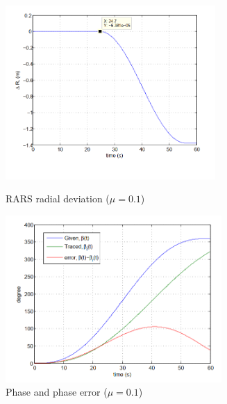 \begin{figure}
	\begin{minipage}[t]{0.5\textwidth}
		\centering
		\includegraphics[height=2.6in, width=\linewidth]{Chapter4/fig/radialError_mu01}
		\caption{RARS radial deviation ($\mu=0.1$)}\label{fig:radialError_mu01}
	\end{minipage}
	\hfill
	\begin{minipage}[t]{0.5\textwidth}
		\centering
		\includegraphics[height=2.5in,width=\textwidth]{Chapter4/fig/phazeError_mu01}
		\caption{Phase and phase error ($\mu=0.1$) }\label{fig:phazeError_mu01}
	\end{minipage}
\end{figure}



